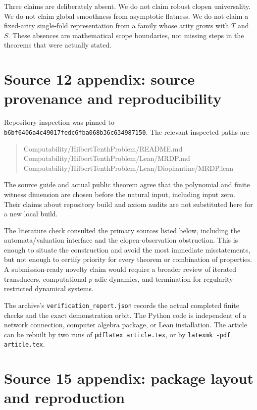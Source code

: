 \documentclass[11pt,letterpaper]{article}
\numberwithin{equation}{section}
\theoremstyle{definition}
\theoremstyle{remark}
\begin{document}
Three claims are deliberately absent. We do not claim robust clopen
universality. We do not claim global smoothness from asymptotic flatness.
We do not claim a fixed-arity single-fold representation from a family
whose arity grows with $T$ and $S$. These absences are mathematical scope
boundaries, not missing steps in the theorems that were actually stated.

\section{Source 12 appendix: source provenance and reproducibility}\label{pqc:ad:app:sources}
Repository inspection was pinned to
\texttt{b6bf6406a4c49017fedc6fba068b36c634987150}. The relevant inspected paths
are
\begin{quote}\small\ttfamily
Computability/HilbertTenthProblem/README.md\\
Computability/HilbertTenthProblem/Lean/MRDP.md\\
Computability/HilbertTenthProblem/Lean/Diophantine/MRDP.lean
\end{quote}
The source guide and actual public theorem agree that the polynomial and
finite witness dimension are chosen before the natural input, including
input zero. Their claims about repository build and axiom audits are not
substituted here for a new local build.

The literature check consulted the primary sources listed below, including
the automata/valuation interface and the clopen-observation obstruction.
This is enough to situate the construction and avoid the most immediate
misstatements, but not enough to certify priority for every theorem or
combination of properties. A submission-ready novelty claim would require
a broader review of iterated transducers, computational $p$-adic dynamics,
and termination for regularity-restricted dynamical systems.

The archive's \texttt{verification\_report.json} records the actual
completed finite checks and the exact demonstration orbit. The Python
code is independent of a network connection, computer algebra package, or
Lean installation. The article can be rebuilt by two runs of
\texttt{pdflatex article.tex}, or by \texttt{latexmk -pdf article.tex}.

\section{Source 15 appendix: package layout and reproduction}
\end{document}
